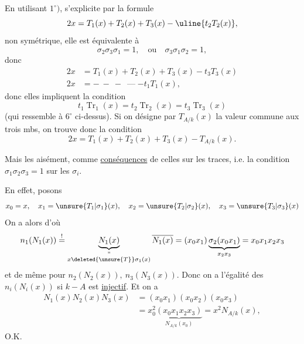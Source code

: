 En utilisant $1^\circ)$,   s'explicite par la formule
\[
 2x=T_1(x)+T_2(x)+T_3(x)-\uline{t_2T_2(x)},
\]
non  symétrique,  elle est équivalente à
\[
 \sigma_2\sigma_3\sigma_1=1,\quad\text{ou}\quad\sigma_3\sigma_1\sigma_2=1,
\]
donc
\[
 \begin{aligned}
 2x&=T_1(x)+T_2(x)+T_3(x)-t_3T_3(x)\\
 2x&=\mathbin{-}\ \mathbin{-}\ \mathbin{-}\ \mathbin{\text{---}}-t_1T_1(x),
 \end{aligned}
\]
donc elles impliquent\unsure{*} la condition
\[
 \boxed{t_1\operatorname{Tr}_1(x)=t_2\operatorname{Tr}_2(x)=t_3\operatorname{Tr}_3(x)}
\]
(qui ressemble à $6^\circ$ ci-dessus). Si on désigne par $T_{A/k}(x)$ la valeur commune aux trois mbs, on trouve donc la condition
\[
 \boxed{2x=T_1(x)+T_2(x)+T_3(x)-T_{A/k}(x).}
\]

Mais  les   aisément, comme \uline{conséquences} de celles sur les traces, i.e. la condition $\sigma_1\sigma_2\sigma_3=1$ sur les $\sigma_i$.

En effet, posons
\[
 x_0=x,\quad x_1=\unsure{T_1|\sigma_1}(x),\quad x_2=\unsure{T_2|\sigma_2}(x),\quad x_3=\unsure{T_3|\sigma_3}(x)
\]
On a alors
d'où
\deleted{\[
 \unsure{n_1|N_1}(N_1(x))=N_1(x)\overline{N_1(x)}=\unsure{x\sigma_2(x\sigma_1(x))}
\]}
\deleted{\[
 N_1(x_1)=\unsure{x_1^2n_1}
\]}
\[
 n_1(N_1(x))\overset{!}{=}\underset{\substack{\text{''}\\x\deleted{\unsure{T}}\sigma_1(x)}}{\underbrace{N_1(x)}}\,\overline{N_1(x)}
 =(x_0x_1)\underbrace{\sigma_2(x_0x_1)}_{x_2x_3}=x_0x_1x_2x_3
\]
et de même pour $n_2(N_2(x)),\ n_3(N_3(x))$. Donc on a l'égalité des $n_i(N_i(x))$ si $k\mathbin{-}A$ est \uline{injectif}. Et on a
\[
 \begin{aligned}
 N_1(x)N_2(x)N_3(x)&=(x_0x_1)(x_0x_2)(x_0x_3)\\
 &=x_0^2\underbrace{(x_0x_1x_2x_3)}_{N_{A/k}(x_0)}=x^2N_{A/k}(x),
 \end{aligned}
\]
O.K.

